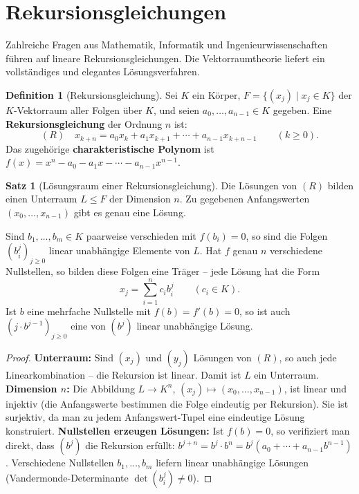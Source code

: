 ﻿\documentclass[a4paper,12pt]{report}
\theoremstyle{definition}
\newtheorem{definition}{Definition}
\newtheorem{satz}{Satz}
\begin{document}
\section{Rekursionsgleichungen}

Zahlreiche Fragen aus Mathematik, Informatik und Ingenieurwissenschaften
führen auf lineare Rekursionsgleichungen. Die Vektorraumtheorie liefert
ein vollständiges und elegantes Lösungsverfahren.

\begin{definition}[Rekursionsgleichung]
    Sei $K$ ein Körper, $F = \{(x_j) \mid x_j \in K\}$ der $K$-Vektorraum
    aller Folgen über $K$, und seien $a_0, \dots, a_{n-1} \in K$ gegeben.
    Eine \textbf{Rekursionsgleichung} der Ordnung $n$ ist:
    \[
        (R) \quad x_{k+n} = a_0 x_k + a_1 x_{k+1} + \cdots + a_{n-1} x_{k+n-1}
        \qquad (k \geq 0).
    \]
    Das zugehörige \textbf{charakteristische Polynom} ist
    $f(x) = x^n - a_0 - a_1 x - \cdots - a_{n-1} x^{n-1}$.
\end{definition}

\begin{satz}[Lösungsraum einer Rekursionsgleichung]
    Die Lösungen von $(R)$ bilden einen Unterraum $L \leq F$ der Dimension $n$.
    Zu gegebenen Anfangswerten $(x_0, \dots, x_{n-1})$ gibt es genau eine
    Lösung.

    Sind $b_1, \dots, b_m \in K$ paarweise verschieden mit $f(b_i) = 0$,
    so sind die Folgen $(b_i^j)_{j \geq 0}$ linear unabhängige Elemente von $L$.
    Hat $f$ genau $n$ verschiedene Nullstellen, so bilden diese Folgen eine
    Träger -- jede Lösung hat die Form
    \[
        x_j = \sum_{i=1}^n c_i b_i^j \qquad (c_i \in K).
    \]
    Ist $b$ eine mehrfache Nullstelle mit $f(b) = f'(b) = 0$, so ist
    auch $(j \cdot b^{j-1})_{j \geq 0}$ eine von $(b^j)$ linear unabhängige
    Lösung.
\end{satz}
\begin{proof}
    \textbf{Unterraum:} Sind $(x_j)$ und $(y_j)$ Lösungen von $(R)$, so auch
    jede Linearkombination -- die Rekursion ist linear. Damit ist $L$ ein Unterraum.
    \textbf{Dimension $n$:} Die Abbildung $L \to K^n$, $(x_j) \mapsto (x_0, \ldots, x_{n-1})$,
    ist linear und injektiv (die Anfangswerte bestimmen die Folge eindeutig per Rekursion).
    Sie ist surjektiv, da man zu jedem Anfangswert-Tupel eine eindeutige Lösung konstruiert.
    \textbf{Nullstellen erzeugen Lösungen:} Ist $f(b) = 0$, so verifiziert man direkt,
    dass $(b^j)$ die Rekursion erfüllt: $b^{j+n} = b^j \cdot b^n = b^j(a_0 + \cdots
    + a_{n-1} b^{n-1})$. Verschiedene Nullstellen $b_1, \ldots, b_m$ liefern linear
    unabhängige Lösungen (Vandermonde-Determinante $\det(b_i^j) \neq 0$).
\end{proof}
\end{document}

